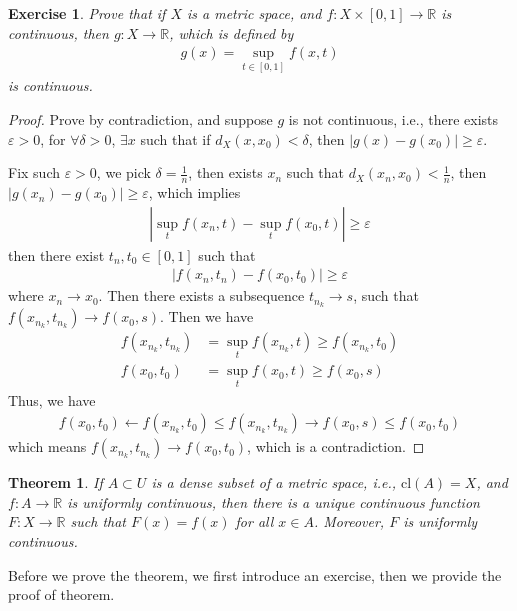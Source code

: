 \documentclass[12pt,leqno]{amsart}
\newtheorem{theorem}{Theorem}[section]
\newtheorem{exercise}{Exercise}[section]
\theoremstyle{definition}
\numberwithin{equation}{subsection}
\begin{document}
\begin{exercise}
Prove that if $X$ is a metric space, and $f:X\times[0,1]\to\mathbb{R}$ is continuous, then $g:X\to\mathbb{R}$, which is defined by 
\begin{align*}
    g(x) = \sup_{t\in[0,1]}f(x,t)
\end{align*}
is continuous.
\end{exercise}
\begin{proof}
Prove by contradiction, and suppose $g$ is not continuous, i.e., there exists $\varepsilon > 0$, for $\forall \delta > 0$, $\exists x$ such that if $d_X(x,x_0) < \delta$, then $|g(x) - g(x_0)|\geq\varepsilon$. 

Fix such $\varepsilon > 0$, we pick $\delta = \frac{1}{n}$, then exists $x_n$ such that $d_X(x_n,x_0) < \frac{1}{n}$, then $|g(x_n) - g(x_0)| \geq \varepsilon$, which implies
\begin{align*}
    \left|\sup_t f(x_n,t) - \sup_t f(x_0,t)\right| \geq \varepsilon
\end{align*}
then there exist $t_n, t_0\in[0,1]$ such that 
\begin{align*}
    \left|f(x_n,t_n) - f(x_0,t_0)\right| \geq \varepsilon
\end{align*}
where $x_n\to x_0$. Then there exists a subsequence $t_{n_k}\to s$, such that $f(x_{n_k},t_{n_k})\to f(x_0,s)$. Then we have 
\begin{align*}
    f(x_{n_k},t_{n_k}) & = \sup_t f(x_{n_k},t) \geq f(x_{n_k},t_0) \\
    f(x_0,t_0) & = \sup_t f(x_0,t) \geq f(x_0,s) 
\end{align*}
Thus, we have 
\begin{align*}
    f(x_0,t_0) \leftarrow f(x_{n_k},t_0) \leq f(x_{n_k},t_{n_k}) \rightarrow f(x_0,s) \leq f(x_0,t_0)
\end{align*}
which means $f(x_{n_k},t_{n_k})\to f(x_0,t_0)$, which is a contradiction.
\end{proof}

\begin{theorem}
If $A\subset U$ is a dense subset of a metric space, i.e., $\text{cl}(A) = X$, and $f:A\to\mathbb{R}$ is uniformly continuous, then there is a unique continuous function $F:X\to\mathbb{R}$ such that $F(x) = f(x)$ for all $x\in A$. Moreover, $F$ is uniformly continuous.
\end{theorem}

Before we prove the theorem, we first introduce an exercise, then we provide the proof of theorem.
\end{document}

